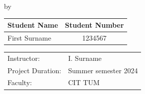 \begin{titlepage}

\begin{center}

{\makeatletter
\largetitlestyle\fontsize{45}{45}\selectfont\@title
\makeatother}

{\makeatletter
\ifdefvoid{\@subtitle}{}{\bigskip\titlestyle\fontsize{20}{20}\selectfont\@subtitle}
\makeatother}

\bigskip
\bigskip

by

\bigskip
\bigskip

{\makeatletter
\largetitlestyle\fontsize{25}{25}\selectfont\@author
\makeatother}

\bigskip
\bigskip

\setlength\extrarowheight{2pt}
\begin{tabular}{lc}
    Student Name & Student Number \\\midrule
    First Surname & 1234567 \\
\end{tabular}

\vfill

\begin{tabular}{ll}
    Instructor: & I. Surname \\
    Project Duration: & Summer semester 2024 \\
    Faculty: & CIT TUM
\end{tabular}

\bigskip
\bigskip


\end{center}


\end{titlepage}
